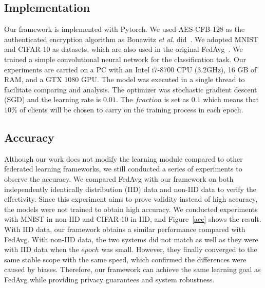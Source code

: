 \subsection{Implementation}
Our framework is implemented with Pytorch. We used AES-CFB-128 as the authenticated encryption algorithm as Bonawitz \emph{et al}. did~\cite{Practical}. We adopted MNIST and CIFAR-10 as datasets, which are also used in the original FedAvg~\cite{mcmahan2016communicationefficient}. We trained a simple convolutional neural network for the classification task. Our experiments are carried on a PC with an Intel i7-8700 CPU (3.2GHz), 16 GB of RAM, and a GTX 1080 GPU. The model was executed in a single thread to facilitate comparing and analysis. The optimizer was stochastic gradient descent (SGD) and the learning rate is $0.01$. The $fraction$ is set as $0.1$ which means that $10\%$ of clients will be chosen to carry on the training process in each epoch. 

\subsection{Accuracy}
Although our work does not modify the learning module compared to other federated learning frameworks, we still conducted a series of experiments to observe the accuracy. We compared FedAvg with our framework on both independently identically distribution (IID) data and non-IID data to verify the effectivity. Since this experiment aims to prove validity instead of high accuracy, the models were not trained to obtain high accuracy. We conducted experiments with MNIST in non-IID and CIFAR-10 in IID, and Figure~\ref{acc} shows the result. With IID data, our framework obtains a similar performance compared with FedAvg. With non-IID data, the two systems did not match as well as they were with IID data when the $epoch$ was small. However, they finally converged to the same stable scope with the same speed, which confirmed the differences were caused by biases. Therefore, our framework can achieve the same learning goal as FedAvg while providing privacy guarantees and system robustness.

